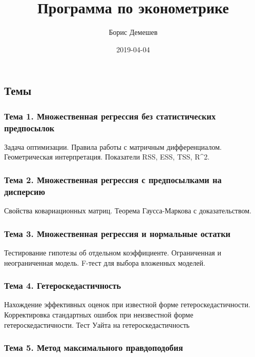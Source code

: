 \documentclass[11pt,russian,]{article}
\title{Программа по эконометрике}
\author{Борис Демешев}
\date{2019-04-04}
\begin{document}
\maketitle

\subsection{Темы}

\hypertarget{-1.-----}{%
\subsubsection{Тема 1. Множественная регрессия без статистических
предпосылок}\label{-1.-----}}

Задача оптимизации. Правила работы с матричным дифференциалом.
Геометрическая интерпретация. Показатели RSS, ESS, TSS, R\^{}2.

\hypertarget{-2.------}{%
\subsubsection{Тема 2. Множественная регрессия с предпосылками на
дисперсию}\label{-2.------}}

Свойства ковариационных матриц. Теорема Гаусса-Маркова с
доказательством.

\hypertarget{-3.-----}{%
\subsubsection{Тема 3. Множественная регрессия и нормальные
остатки}\label{-3.-----}}

Тестирование гипотезы об отдельном коэффициенте. Ограниченная и
неограниченная модель. F-тест для выбора вложенных моделей.

\hypertarget{-4.-}{%
\subsubsection{Тема 4. Гетероскедастичность}\label{-4.-}}

Нахождение эффективных оценок при известной форме гетероскедастичности.
Корректировка стандартных ошибок при неизвестной форме
гетероскедастичности. Тест Уайта на гетероскедастичность

\hypertarget{-5.---}{%
\subsubsection{Тема 5. Метод максимального правдоподобия}\label{-5.---}}
\end{document}
